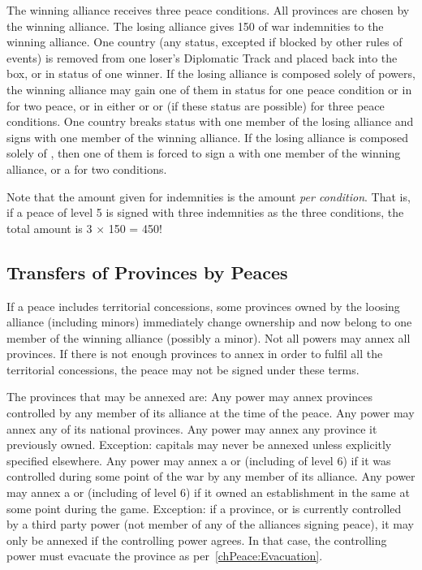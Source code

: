  The winning alliance receives
three peace conditions.
 All provinces are chosen by the winning
alliance.
\bparag[Indemnities] The losing alliance gives 150 \ducats of war indemnities
to the winning alliance.
 One country (any status, excepted if blocked
by other rules of events) is removed from one loser's Diplomatic Track and
placed back into the \Neutral box, or in \MR status of one winner. If the
losing alliance is composed solely of \MIN powers, the winning alliance may
gain one of them in \MR status for one peace condition or in \AM for two
peace, or in either \EG or \VASSAL or \ANNEXION (if these status are possible)
for three peace conditions.
 One \ROTW country breaks status with one
member of the losing alliance and signs \dipFR with one member of the winning
alliance. If the losing alliance is composed solely of \MIN, then one of them
is forced to sign a \dipFR with one member of the winning alliance, or a
\dipAT for two conditions.

\aparag[Indemnities] Note that the amount given for indemnities is the amount
\emph{per condition}. That is, if a peace of level 5 is signed with three
indemnities as the three conditions, the total amount is 3 $\times$ 150 =
450\ducats !



\subsection{Transfers of Provinces by Peaces}\label{chPeace:Transfer
  Provinces Peace}
\aparag If a peace includes territorial concessions, some provinces owned by
the loosing alliance (including minors) immediately change ownership and now
belong to one member of the winning alliance (possibly a minor).
\bparag Not all powers may annex all provinces. If there is not enough
provinces to annex in order to fulfil all the territorial concessions, the
peace may not be signed under these terms.

 The provinces that may be annexed are:
\bparag Any power may annex provinces controlled by any member of its alliance
at the time of the peace.
\bparag Any power may annex any of its national provinces.
\bparag Any power may annex any province it previously owned.
\bparag Exception: capitals may never be annexed unless explicitly specified
elsewhere.
\bparag Any power may annex a \TP or \COL (including of level 6) if it was
controlled during some point of the war by any member of its alliance.
\bparag Any power may annex a \TP or \COL (including of level 6) if it owned
an establishment in the same \Area at some point during the game.
\bparag Exception: if a province, \TP or \COL is currently controlled by a
third party power (not member of any of the alliances signing peace), it may
only be annexed if the controlling power agrees. In that case, the controlling
power must evacuate the province as per~\ref{chPeace:Evacuation}.

